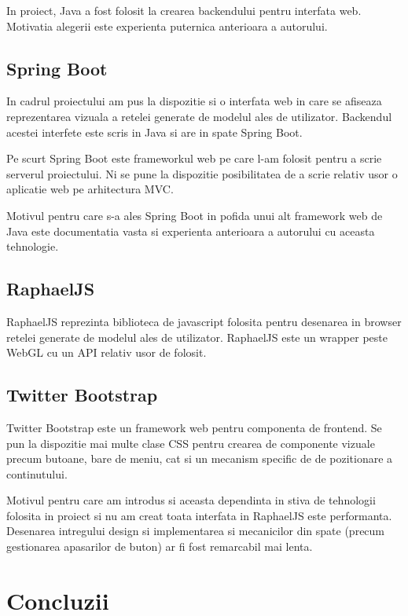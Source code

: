 \documentclass[12pt]{article}
\begin{document}
In proiect, Java a fost folosit la crearea backendului pentru interfata web. Motivatia alegerii este experienta puternica anterioara a autorului.

\subsection{Spring Boot}

In cadrul proiectului am pus la dispozitie si o interfata web in care se afiseaza reprezentarea vizuala a retelei generate de modelul ales de utilizator. Backendul acestei interfete este scris in Java si are in spate Spring Boot.

Pe scurt Spring Boot este frameworkul web pe care l-am folosit pentru a scrie serverul proiectului. Ni se pune la dispozitie posibilitatea de a scrie relativ usor o aplicatie web pe arhitectura MVC. 


Motivul pentru care s-a ales Spring Boot in pofida unui alt framework web de Java este documentatia vasta si experienta anterioara a autorului cu aceasta tehnologie.

\subsection{RaphaelJS}

RaphaelJS reprezinta biblioteca de javascript folosita pentru desenarea in browser retelei generate de modelul ales de utilizator. RaphaelJS este un wrapper peste WebGL cu un API relativ usor de folosit.


\subsection{Twitter Bootstrap}

Twitter Bootstrap este un framework web pentru componenta de frontend. Se pun la dispozitie mai multe clase CSS pentru crearea de componente vizuale precum butoane, bare de meniu, cat si un mecanism specific de de pozitionare a continutului.

Motivul pentru care am introdus si aceasta dependinta in stiva de tehnologii folosita in proiect si nu am creat toata interfata in RaphaelJS este performanta. Desenarea intregului design si implementarea si mecanicilor din spate (precum gestionarea apasarilor de buton) ar fi fost remarcabil mai lenta.

\pagebreak

\section{Concluzii}
\end{document}
